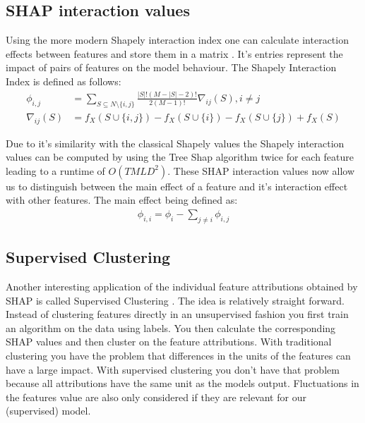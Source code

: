 \documentclass[conference]{IEEEtran}
\begin{document}
\subsection{SHAP interaction values}
Using the more modern Shapely interaction index \cite{b14} one can calculate interaction effects between features and store them in a matrix \cite{b1}. It's entries represent the impact of pairs of features on the model behaviour. The Shapely Interaction Index is defined as follows:\\
\begin{align}
\phi_{i,j} &= \sum_{S \subseteq N \setminus \{i, j\}} \frac{|S|!(M - |S| - 2)!}{2(M - 1)!}\nabla_{ij}(S), i\neq j \\
\nabla_{ij}(S) &= f_X(S \cup \{i,j\}) - f_X(S \cup \{i\}) - f_X(S \cup \{j\}) + f_X(S)
\end{align}

Due to it's similarity with the classical Shapely values the Shapely interaction values can be computed by using the Tree Shap algorithm twice for each feature leading to a runtime of $O(TMLD^2)$. These SHAP interaction values now allow us to distinguish between the main effect of a feature and it's interaction effect with other features. The main effect being defined as:
\begin{align}
\phi_{i,i} = \phi_i - \sum_{j \neq i} \phi_{i,j}
\end{align}


\subsection{Supervised Clustering}
Another interesting application of the individual feature attributions obtained by SHAP is called Supervised Clustering \cite{b1}. The idea is relatively straight forward. Instead of clustering features directly in an unsupervised fashion you first train an algorithm on the data using labels. You then calculate the corresponding SHAP values and then cluster on the feature attributions. With traditional clustering you have the problem that differences in the units of the features can have a large impact. With supervised clustering you don't have that problem because all attributions have the same unit as the models output. 
Fluctuations in the features value are also only considered if they are relevant for our (supervised) model.
\end{document}
